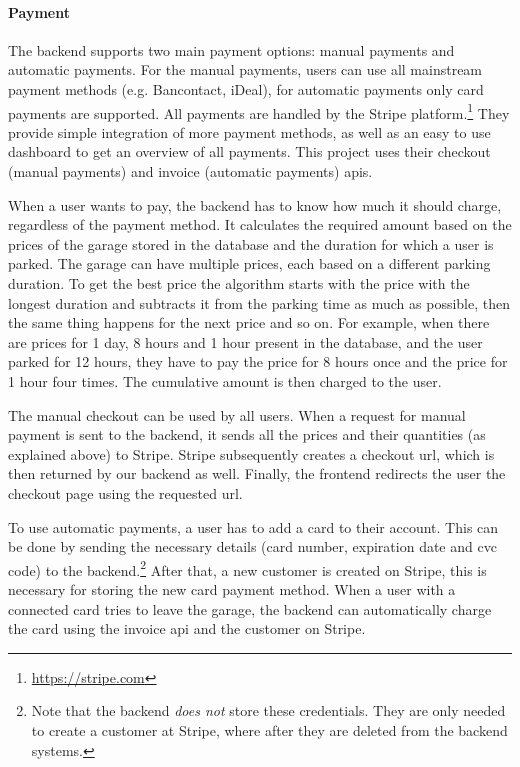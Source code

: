 \paragraph{Payment}
The backend supports two main payment options: manual payments and automatic payments. For the manual payments, users can use all mainstream payment methods (e.g. Bancontact, iDeal), for automatic payments only card payments are supported. All payments are handled by the Stripe platform.\footnote{\url{https://stripe.com}} They provide simple integration of more payment methods, as well as an easy to use dashboard to get an overview of all payments. This project uses their checkout (manual payments) and invoice (automatic payments) \acp{api}. 

\ind When a user wants to pay, the backend has to know how much it should charge, regardless of the payment method. It calculates the required amount based on the prices of the garage stored in the database and the duration for which a user is parked. The garage can have multiple prices, each based on a different parking duration. To get the best price the algorithm starts with the price with the longest duration and subtracts it from the parking time as much as possible, then the same thing happens for the next price and so on. For example, when there are prices for 1 day, 8 hours and 1 hour present in the database, and the user parked for 12 hours, they have to pay the price for 8 hours once and the price for 1 hour four times. The cumulative amount is then charged to the user.

\ind The manual checkout can be used by all users. When a request for manual payment is sent to the backend, it sends all the prices and their quantities (as explained above) to Stripe. Stripe subsequently creates a checkout \ac{url}, which is then returned by our backend as well. Finally, the frontend redirects the user the checkout page using the requested \ac{url}.

\ind To use automatic payments, a user has to add a card to their account. This can be done by sending the necessary details (card number, expiration date and \ac{cvc} code) to the backend.\footnote{Note that the backend \textit{does not} store these credentials. They are only needed to create a customer at Stripe, where after they are deleted from the backend systems.} After that, a new customer is created on Stripe, this is necessary for storing the new card payment method. When a user with a connected card tries to leave the garage, the backend can automatically charge the card using the invoice \ac{api} and the customer on Stripe. 

